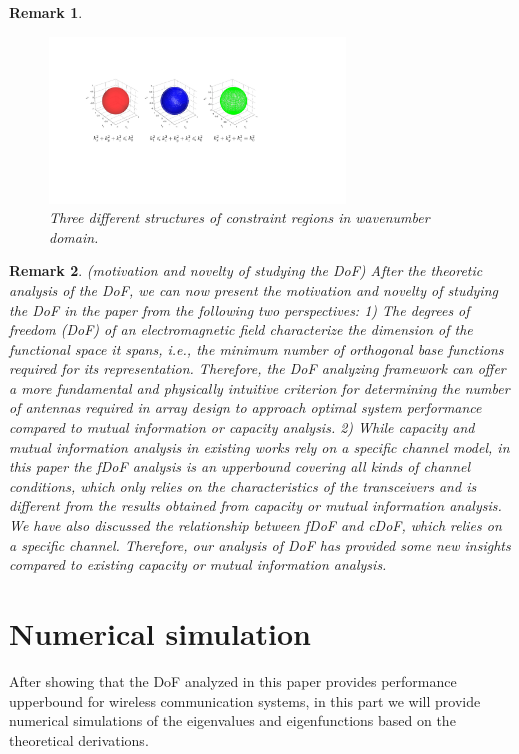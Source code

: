 \documentclass[12pt,draftclsnofoot,journal,onecolumn]{IEEEtran}
\newtheorem{remark}{Remark}
\begin{document}
{\begin{remark}
			\begin{figure}
		\centering 
		\includegraphics[width=0.7\textwidth]{figs/Three_d_comparison.pdf} 
		\caption{\color{red} Three different structures of constraint regions in wavenumber domain.} 
		\label{Three_d_comparison}
	\end{figure}
	\end{remark}
	}
	

	{\color{red}
	\begin{remark}
		(motivation and novelty of studying the DoF)
		After the theoretic analysis of the DoF, we can now present the motivation and novelty of studying the DoF in the paper from the following two perspectives: 1) The degrees of freedom (DoF) of an electromagnetic field characterize the dimension of the functional space it spans, i.e., the minimum number of orthogonal base functions required for its representation. Therefore, the DoF analyzing framework can offer a more fundamental and physically intuitive criterion for determining the number of antennas required in array design to approach optimal system performance compared to mutual information or capacity analysis. 2) While capacity and mutual information analysis in existing works rely on a specific channel model, in this paper the fDoF analysis is an upperbound covering all kinds of channel conditions, which only relies on the characteristics of the transceivers and is different from the results obtained from capacity or mutual information analysis. We have also discussed the relationship between fDoF and cDoF, which relies on a specific channel. Therefore, our analysis of DoF has provided some new insights compared to existing capacity or mutual information analysis. 
	\end{remark}
	}
	
	\section{Numerical simulation}
	
	After showing that the DoF analyzed in this paper provides performance upperbound for wireless communication systems, in this part we will provide numerical simulations of the eigenvalues and eigenfunctions based on the theoretical derivations. 
\end{document}
